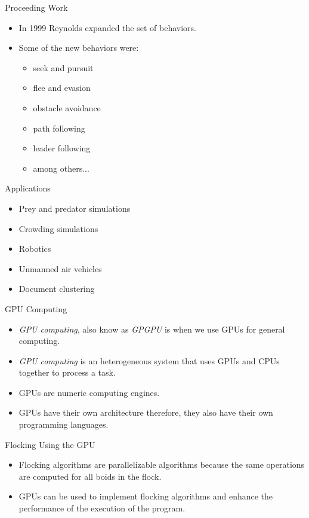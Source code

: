 \documentclass[red]{beamer}
\begin{document}
\begin{frame}{Proceeding Work}
	\begin{itemize}
		\pause \item In 1999 Reynolds expanded the set of behaviors.
		\pause \item Some of the new behaviors were:
			\begin{itemize}
				\pause \item seek and pursuit
				\pause \item flee and evasion
				\pause \item obstacle avoidance
				\pause \item path following
				\pause \item leader following
				\pause \item among others...
			\end{itemize}
	\end{itemize}
\end{frame}
		
\begin{frame}{Applications}
	\begin{itemize}
		\pause \item Prey and predator simulations
		\pause \item Crowding simulations
		\pause \item Robotics
		\pause \item Unmanned air vehicles
		\pause \item Document clustering
	\end{itemize}
\end{frame}

\begin{frame}{GPU Computing}
	\begin{itemize}
		\pause \item \textit{GPU computing}, also know as \textit{GPGPU} is when we use GPUs for general computing.
		\pause \item \textit{GPU computing} is an heterogeneous system that uses GPUs and CPUs together to process a task.
		\pause \item GPUs are numeric computing engines.
		\pause \item GPUs have their own architecture therefore, they also have their own programming languages.
	\end{itemize}
\end{frame}

\begin{frame}{Flocking Using the GPU}
	\begin{itemize}
		\pause \item Flocking algorithms are parallelizable algorithms because the same operations are computed for all boids in the flock.
		\pause \item GPUs can be used to implement flocking algorithms and enhance the performance of the execution of the program.
	\end{itemize}
\end{frame}
\end{document}
